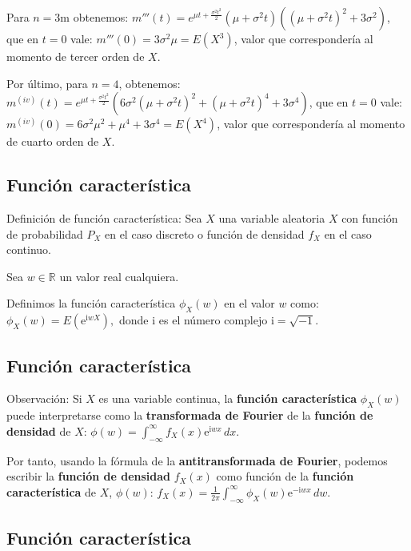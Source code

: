 \documentclass[]{book}
\begin{document}
Para \(n=3\)m obtenemos:
\(m'''(t)=e^{\mu t+\frac{\sigma ^2 t^2}{2}}\left(\mu +\sigma ^2 t\right) \left(\left(\mu +\sigma ^2 t\right)^2+3 \sigma ^2\right)\), que en \(t=0\) vale: \(m'''(0)=3\sigma^2\mu = E\left(X^3\right)\), valor que correspondería al momento de tercer orden de \(X\).

Por último, para \(n=4\), obtenemos:
\(m^{(iv)}(t)=e^{\mu t+\frac{\sigma ^2 t^2}{2}}  \left(6 \sigma ^2 \left(\mu  +\sigma ^2 t\right)^2+\left(\mu  +\sigma ^2 t\right)^4+3 \sigma  ^4\right)\), que en \(t=0\) vale: \(m^{(iv)}(0)=6\sigma^2\mu^2+\mu^4+3\sigma^4=E\left(X^4\right)\), valor que correspondería al momento de cuarto orden de \(X\).

\hypertarget{funciuxf3n-caracteruxedstica}{%
\subsection{Función característica}\label{funciuxf3n-caracteruxedstica}}

Definición de función característica:
Sea \(X\) una variable aleatoria \(X\) con función de probabilidad \(P_X\) en el caso discreto o función
de densidad \(f_X\) en el caso continuo.

Sea \(w\in\mathbb{R}\) un valor real cualquiera.

Definimos la función característica \(\phi_X(w)\) en el valor \(w\) como: \(\phi_X(w)=E\left(\mathrm{e}^{\mathrm{i} w X}\right),\) donde \(\mathrm{i}\) es el número complejo \(\mathrm{i}=\sqrt{-1}\).

\hypertarget{funciuxf3n-caracteruxedstica-1}{%
\subsection{Función característica}\label{funciuxf3n-caracteruxedstica-1}}

Observación:
Si \(X\) es una variable continua, la \textbf{función característica} \(\phi_X(w)\) puede interpretarse como la \textbf{transformada de Fourier} de la \textbf{función de densidad} de \(X\):
\(\phi(w)=\int_{-\infty}^\infty f_X(x)\mathrm{e}^{\mathrm{i}w x}\, dx.\)

Por tanto, usando la fórmula de la \textbf{antitransformada de Fourier}, podemos escribir la \textbf{función de densidad} \(f_X(x)\) como función de la \textbf{función característica} de \(X\), \(\phi(w)\):
\(f_X(x)=\frac{1}{2\pi}\int_{-\infty}^\infty \phi_X(w)\mathrm{e}^{-\mathrm{i}w x}\, dw.\)

\hypertarget{funciuxf3n-caracteruxedstica-2}{%
\subsection{Función característica}\label{funciuxf3n-caracteruxedstica-2}}
\end{document}
